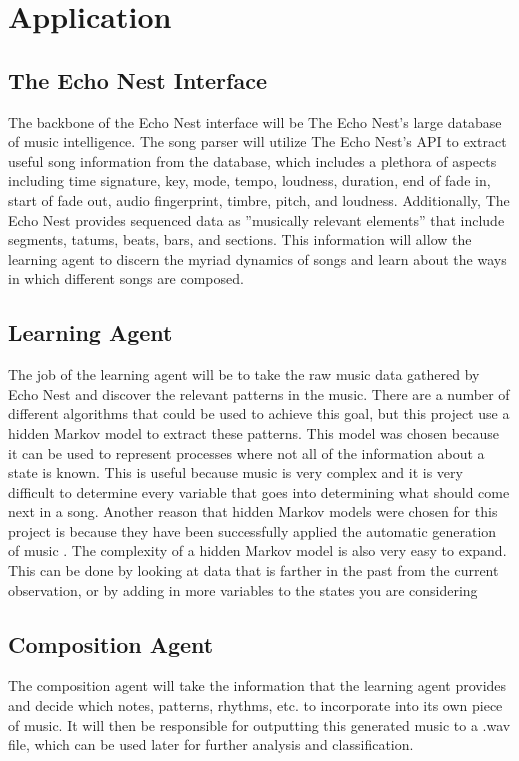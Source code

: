 \documentclass{article}
\begin{document}
\section{Application}
\subsection{The Echo Nest Interface}
The backbone of the Echo Nest interface will be The Echo Nest’s large database of music intelligence. The
song parser will utilize The Echo Nest’s API to extract useful song information from the database, which
includes a plethora of aspects including time signature, key, mode, tempo, loudness, duration, end of fade
in, start of fade out, audio fingerprint, timbre, pitch, and loudness. Additionally, The Echo Nest provides
sequenced data as ”musically relevant elements” that include segments, tatums, beats, bars, and sections.
This information will allow the learning agent to discern the myriad dynamics of songs and learn about the
ways in which different songs are composed.

\subsection{Learning Agent}
The job of the learning agent will be to take the raw music data gathered by Echo Nest and discover the
relevant patterns in the music. There are a number of different algorithms that could be used to achieve this
goal, but this project use a hidden Markov model to extract these patterns. This model was chosen because
it can be used to represent processes where not all of the information about a state is known. This is useful
because music is very complex and it is very difficult to determine every variable that goes into determining
what should come next in a song. Another reason that hidden Markov models were chosen for this project
is because they have been successfully applied the automatic generation of music \cite{SOMETHING GOES HERE}.
The complexity of a hidden Markov model is also very easy to expand. This can be done by looking at data that is farther in
the past from the current observation, or by adding in more variables to the states you are considering

\subsection{Composition Agent}
The composition agent will take the information that the learning agent provides and decide which notes,
patterns, rhythms, etc. to incorporate into its own piece of music. It will then be responsible for outputting
this generated music to a .wav file, which can be used later for further analysis and classification.
\end{document}

